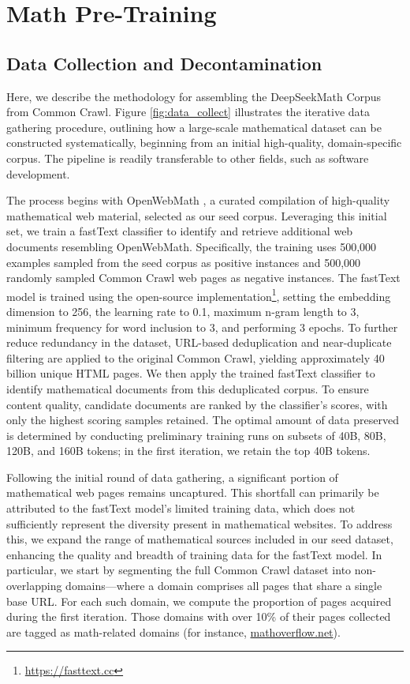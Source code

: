 \section{Math Pre-Training}

\subsection{Data Collection and Decontamination}
Here, we describe the methodology for assembling the DeepSeekMath Corpus from Common Crawl. Figure \ref{fig:data_collect} illustrates the iterative data gathering procedure, outlining how a large-scale mathematical dataset can be constructed systematically, beginning from an initial high-quality, domain-specific corpus. The pipeline is readily transferable to other fields, such as software development.

The process begins with OpenWebMath \citep{openwebmath}, a curated compilation of high-quality mathematical web material, selected as our seed corpus. Leveraging this initial set, we train a fastText classifier \citep{joulin2016fasttext} to identify and retrieve additional web documents resembling OpenWebMath. Specifically, the training uses 500,000 examples sampled from the seed corpus as positive instances and 500,000 randomly sampled Common Crawl web pages as negative instances. The fastText model is trained using the open-source implementation\footnote{\url{https://fasttext.cc}}, setting the embedding dimension to 256, the learning rate to 0.1, maximum n-gram length to 3, minimum frequency for word inclusion to 3, and performing 3 epochs. To further reduce redundancy in the dataset, URL-based deduplication and near-duplicate filtering are applied to the original Common Crawl, yielding approximately 40 billion unique HTML pages. We then apply the trained fastText classifier to identify mathematical documents from this deduplicated corpus. To ensure content quality, candidate documents are ranked by the classifier’s scores, with only the highest scoring samples retained. The optimal amount of data preserved is determined by conducting preliminary training runs on subsets of 40B, 80B, 120B, and 160B tokens; in the first iteration, we retain the top 40B tokens.

Following the initial round of data gathering, a significant portion of mathematical web pages remains uncaptured. This shortfall can primarily be attributed to the fastText model’s limited training data, which does not sufficiently represent the diversity present in mathematical websites. To address this, we expand the range of mathematical sources included in our seed dataset, enhancing the quality and breadth of training data for the fastText model. In particular, we start by segmenting the full Common Crawl dataset into non-overlapping domains—where a domain comprises all pages that share a single base URL. For each such domain, we compute the proportion of pages acquired during the first iteration. Those domains with over 10\% of their pages collected are tagged as math-related domains (for instance, \url{mathoverflow.net}). 

